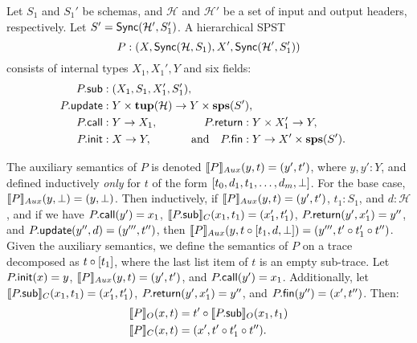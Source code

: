 \begin{definition}
Let $S_1$ and $S_1'$ be schemas, and $\mathcal{H}$ and $\mathcal{H}'$
be a set of input and output headers, respectively.
Let $S' = \hier{\mathcal{H}'}{S_1'}$.
A hierarchical SPST
\[
P : (X, \hier{\mathcal{H}}{S_1}, X', \hier{\mathcal{H}'}{S_1'})
\]
consists of internal types $X_1, X_1', Y$ and
six fields:
\begin{alignat*}{3}
\spstfield{P}{sub} &: (X_1, S_1, X_1', S_1'),
    \hspace{-1em} \\
\spstfield{P}{update} &: Y \times \tup(\mathcal{H}) \to Y \times \sps(S'),
    \hspace{-8em} \\
\spstfield{P}{call} &: Y \to X_1,
    &\spstfield{P}{return} &: Y \times X_1' \to Y, \\
\spstfield{P}{init} &: X \to Y,
    &\text{and} \quad \spstfield{P}{fin} &: Y \to X' \times \sps(S').
\end{alignat*}

The auxiliary semantics of $P$ is denoted
$\spstsemI{y}{t}{P} = (y', t')$, where $y, y': Y$,
and defined inductively
\emph{only} for $t$
of the form $[t_0, d_1, t_1, \ldots, d_m, \spsemp{}]$.
For the base case, $\spstsemI{y}{\spsemp{}}{P} = (y, \spsemp{})$.
Then inductively, if
$\spstsemI{y}{t}{P} = (y', t')$,
$t_1: S_1$, and
$d: \mathcal{H}$,
and if we have
$\spstfield{P}{call}(y') = x_1$,
$\spstsemC{x_1}{t_1}{\spstfield{P}{sub}} = (x_1', t_1')$,
$\spstfield{P}{return}(y', x_1') = y''$,
and $\spstfield{P}{update}(y'', d) = (y''', t'')$,
then
$\spstsemI{y}{t \circ \spsseq{t_1, d, \spsemp}}{P} = (y''', t' \circ t_1' \circ t'')$.
Given the auxiliary semantics, we define the semantics
of $P$ on a trace decomposed as $t \circ \spsseq{t_1}$,
where the last list item of $t$ is an empty sub-trace.
Let
$\spstfield{P}{init}(x) = y$,
$\spstsemI{y}{t}{P} = (y', t')$,
and $\spstfield{P}{call}(y') = x_1$.
Additionally, let
$\spstsemC{x_1}{t_1}{\spstfield{P}{sub}} = (x_1', t_1')$,
$\spstfield{P}{return}(y', x_1') = y''$,
and $\spstfield{P}{fin}(y'') = (x', t'')$.
Then:
\begin{align*}
\spstsemO{x}{t}{P}
    &= t' \circ \spstsemO{x_1}{t_1}{\spstfield{P}{sub}} \\
\spstsemC{x}{t}{P}
    &= (x', t' \circ t_1' \circ t'').
\end{align*}
\end{definition}


